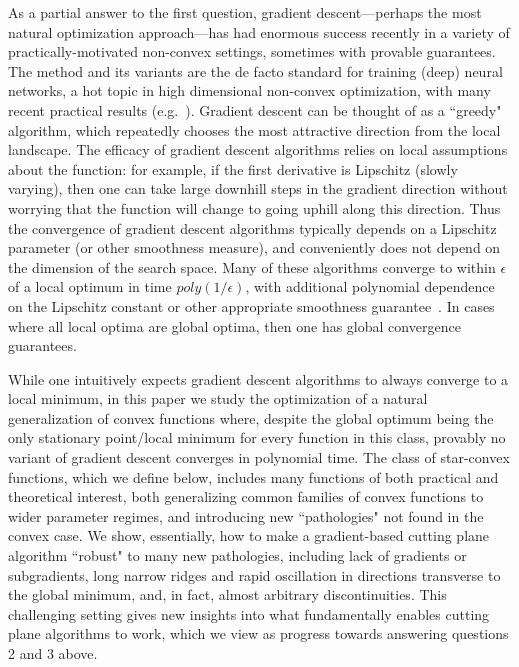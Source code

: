 \documentclass[11pt,letter]{article}
\newcommand{\ferr}{\epsilon}
\numberwithin{nTheorems}{section}
\begin{document}
As a partial answer to the first question, gradient descent---perhaps the most natural optimization approach---has had enormous success recently in a variety of practically-motivated non-convex settings, sometimes with provable guarantees. The method and its variants are the de facto standard for training (deep) neural networks, a hot topic in high dimensional non-convex optimization, with many recent practical results (e.g.~\cite{Imagenet,AlphaGo}). Gradient descent can be thought of as a ``greedy" algorithm, which repeatedly chooses the most attractive direction from the local landscape. The efficacy of gradient descent algorithms relies on local assumptions about the function: for example, if the first derivative is Lipschitz (slowly varying), then one can take large downhill steps in the gradient direction without worrying that the function will change to going uphill along this direction. Thus the convergence of gradient descent algorithms typically depends on a Lipschitz parameter (or other smoothness measure), and conveniently does not depend on the dimension of the search space. Many of these algorithms converge to within $\ferr$ of a local optimum in time $poly(1/\ferr)$, with additional polynomial dependence on the Lipschitz constant or other appropriate smoothness guarantee~\cite{Nesterov:AGD,Hazan:2015}. In cases where all local optima are global optima, then one has global convergence guarantees.

While one intuitively expects gradient descent algorithms to always converge to a local minimum, in this paper we study the optimization of a natural generalization of convex functions where, despite the global optimum being the only stationary point/local minimum for every function in this class, provably no variant of gradient descent converges in polynomial time. The class of star-convex functions, which we define below, includes many functions of both practical and theoretical interest, both generalizing common families of convex functions to wider parameter regimes, and introducing new ``pathologies" not found in the convex case. We show, essentially, how to make a gradient-based cutting plane algorithm ``robust" to many new pathologies, including lack of gradients or subgradients, long narrow ridges and rapid oscillation in directions transverse to the global minimum, and, in fact, almost arbitrary discontinuities. This challenging setting gives new insights into what fundamentally enables cutting plane algorithms to work, which we view as progress towards answering questions 2 and 3 above.
\end{document}
